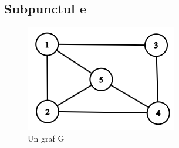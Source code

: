 \documentclass{article}
\begin{document}
\subsection*{\fontsize{16}{30}\selectfont Subpunctul e}

\begin{figure}[h]
    \centering
    \begin{minipage}{0.45\textwidth}
        \centering
        \includegraphics[width=\textwidth]{images/graph_cropped.png}
        \caption{Un graf G}
        \label{fig:graf}
    \end{minipage}\hfill
    \begin{minipage}{0.45\textwidth}
        \centering

\end{minipage}
\end{figure}
\end{document}

